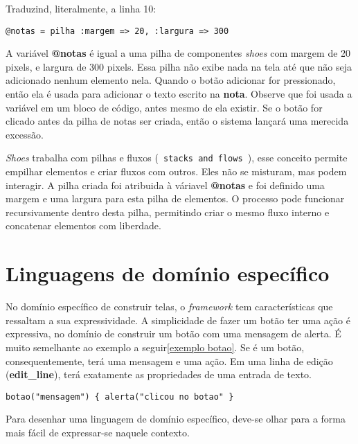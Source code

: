 \documentclass[espaco=simples,appendix=Name]{abnt}
\begin{document}
 

Traduzind, literalmente, a linha 10:

\begin{lstlisting}[caption=Entendendo a pilha de componentes]
  @notas = pilha :margem => 20, :largura => 300
\end{lstlisting}

A variável \textbf{@notas} é igual a uma pilha de componentes \textit{shoes} com margem de 20 pixels, e largura de 300 pixels. Essa pilha não exibe nada na tela até que não seja adicionado nenhum elemento nela. Quando o botão adicionar for pressionado, então ela é usada para adicionar o texto escrito na \textbf{nota}. Observe que foi usada a variável em um bloco de código, antes mesmo de ela existir. Se o botão for clicado antes da pilha de notas ser criada, então o sistema lançará uma merecida excessão. 

\textit{Shoes} trabalha com pilhas e fluxos (\texttt{ stacks and flows }), esse conceito permite empilhar elementos e criar fluxos com outros. Eles não se misturam, mas podem interagir. A pilha criada foi atribuida à váriavel \textbf{ @notas } e foi definido uma margem e uma largura para esta pilha de elementos. O processo pode funcionar recursivamente dentro desta pilha, permitindo criar o mesmo fluxo interno e concatenar elementos com liberdade.

\chapter { Linguagens de domínio específico }

No domínio específico de construir telas, o \textit{framework} tem características que ressaltam a sua expressividade. A simplicidade de fazer um botão ter uma ação é expressiva, no domínio de construir um botão com uma mensagem de alerta. É muito semelhante ao exemplo a seguir\ref{exemplo botao}. Se é um botão, consequentemente, terá uma mensagem e uma ação.  Em uma linha de edição (\textbf{edit\_line}), terá exatamente as propriedades de uma entrada de texto. 


\begin{lstlisting}[label=exemplo botao, caption=Simplicidade do botão]
botao("mensagem") { alerta("clicou no botao" } 
\end{lstlisting}


Para desenhar uma linguagem de domínio específico, deve-se olhar para a forma mais fácil de expressar-se naquele contexto.
\end{document}
